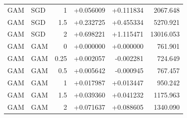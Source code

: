\begin{table}[t]
\begin{tabular}{llrrrr}
GAM & SGD & 1 & +0.056009 & +0.111834 & 2067.648 \\
GAM & SGD & 1.5 & +0.232725 & +0.455334 & 5270.921 \\
GAM & SGD & 2 & +0.698221 & +1.115471 & 13016.053 \\
GAM & GAM & 0 & +0.000000 & +0.000000 & 761.901 \\
GAM & GAM & 0.25 & +0.002057 & -0.002281 & 724.649 \\
GAM & GAM & 0.5 & +0.005642 & -0.000945 & 767.457 \\
GAM & GAM & 1 & +0.017987 & +0.013447 & 950.242 \\
GAM & GAM & 1.5 & +0.039360 & +0.041232 & 1175.963 \\
GAM & GAM & 2 & +0.071637 & +0.088605 & 1340.090 \\
\bottomrule
\end{tabular}
\end{table}
